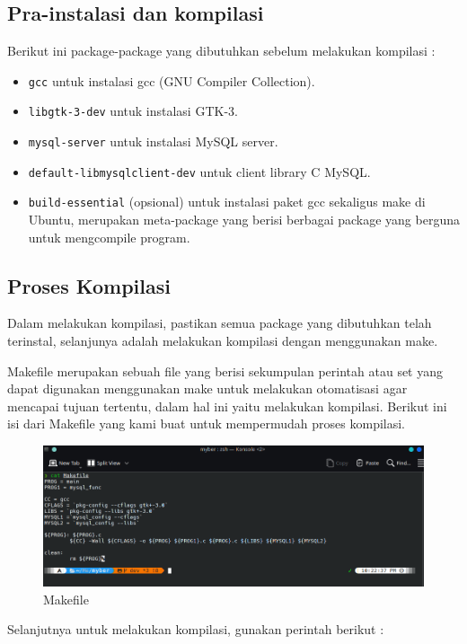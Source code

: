 \documentclass[a4paper,12pt]{article}
\begin{document}
\subsection{Pra-instalasi dan kompilasi}
Berikut ini package-package yang dibutuhkan sebelum melakukan kompilasi :
\begin{itemize}
    \item \texttt{gcc} untuk instalasi gcc (GNU Compiler Collection).
    \item \texttt{libgtk-3-dev} untuk instalasi GTK-3.
    \item \texttt{mysql-server} untuk instalasi MySQL server.
    \item \texttt{default-libmysqlclient-dev} untuk client library C MySQL.
    \item \texttt{build-essential} (opsional) untuk instalasi paket gcc sekaligus make di Ubuntu, merupakan meta-package yang berisi berbagai package yang berguna untuk mengcompile program.
\end{itemize}

\subsection{Proses Kompilasi}
Dalam melakukan kompilasi, pastikan semua package yang dibutuhkan telah terinstal, selanjunya adalah melakukan kompilasi dengan menggunakan make.

Makefile merupakan sebuah file yang berisi sekumpulan perintah atau set yang dapat digunakan menggunakan make untuk melakukan otomatisasi agar mencapai tujuan tertentu, dalam hal ini yaitu melakukan kompilasi.
Berikut ini isi dari Makefile yang kami buat untuk mempermudah proses kompilasi.
\begin{figure}[!htbp]
    \centering
    \includegraphics[width=1\textwidth]{./Makefile.png}
    \caption{Makefile}

\end{figure}
\FloatBarrier 

Selanjutnya untuk melakukan kompilasi, gunakan perintah berikut :
\end{document}
